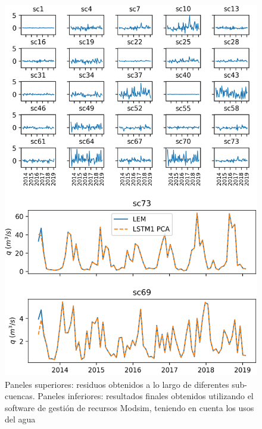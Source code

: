   \begin{figure}[h!]
    \begin{center}
      \includegraphics[height=6.5in]{Figures/modzim/comp_modzim.png}
      \caption{ Paneles superiores: residuos obtenidos a lo largo de diferentes sub-cuencas. 
      Paneles inferiores: resultados finales obtenidos utilizando el software de gestión de recursos Modsim, teniendo en cuenta los usos del agua}
      \label{modsim}
    \end{center}
  \end{figure}


